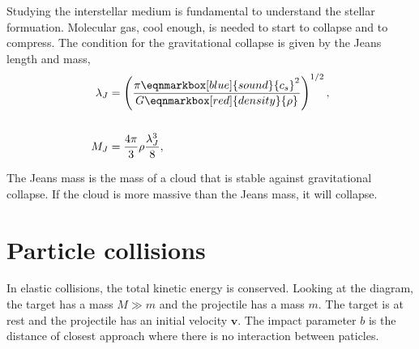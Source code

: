  \label{ch:Introduction}

Studying the interstellar medium is fundamental to understand the stellar formuation. Molecular gas, cool enough, is needed to start to collapse and to compress. The condition for the gravitational collapse is given by the \textsf{Jeans length and mass},
\vspace{5mm}
\begin{equation}
  \begin{aligned}
    \lambda_J &= \left( \frac{\pi \eqnmarkbox[blue]{sound}{c_s}^2}{G \eqnmarkbox[red]{density}{\rho}} \right)^{1/2}, \\ 
    \vspace{10mm}\\
    M_J &= \frac{4\pi}{3} \rho \frac{\lambda_J^3}{8},
  \end{aligned}
\end{equation}
\vspace{-5mm}

The Jeans mass is the mass of a cloud that is stable against gravitational collapse. If the cloud is more massive than the Jeans mass, it will collapse. 
\section*{Particle collisions}

In \textsf{elastic collisions}, the total kinetic energy is conserved. Looking at the diagram, the target has a mass $M\gg m$ and the projectile has a mass $m$. The target is at rest and the projectile has an initial velocity $\mathbf{v}$. The impact parameter $b$ is the distance of closest approach where there is no interaction between paticles.

\begin{center}
\end{center}

